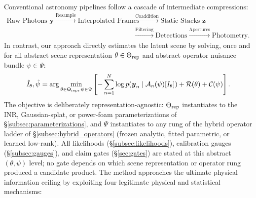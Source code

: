 \documentclass[11pt,a4paper]{article}
\begin{document}
Conventional astronomy pipelines follow a cascade of intermediate compressions:
\begin{equation*}
\begin{aligned}
\text{Raw Photons } \boldsymbol{y} \xrightarrow{\text{Resample}} \text{Interpolated Frames} &\xrightarrow{\text{Coaddition}} \text{Static Stacks } \boldsymbol{z} \\
&\xrightarrow{\text{Filtering}} \text{Detections} \xrightarrow{\text{Apertures}} \text{Photometry}.
\end{aligned}
\end{equation*}
In contrast, our approach directly estimates the latent scene by solving, once and for all abstract scene representation $\theta \in \Theta_{\rm rep}$ and abstract operator nuisance bundle $\psi \in \Psi$:
\begin{equation}
\hat{I}_\theta, \hat{\psi} = \arg\min_{\theta \in \Theta_{\rm rep},\, \psi \in \Psi} \left[ -\sum_{n=1}^N \log p(\boldsymbol{y}_n \mid \mathcal{A}_n(\psi)[I_\theta]) + \mathcal{R}(\theta) + \mathcal{C}(\psi) \right].
\label{eq:joint_objective}
\end{equation}
The objective is deliberately representation-agnostic: $\Theta_{\rm rep}$ instantiates to the INR, Gaussian-splat, or power-foam parameterizations of \S\ref{subsec:parameterizations}, and $\Psi$ instantiates to any rung of the hybrid operator ladder of \S\ref{subsec:hybrid_operators} (frozen analytic, fitted parametric, or learned low-rank). All likelihoods (\S\ref{subsec:likelihoods}), calibration gauges (\S\ref{subsec:gauges}), and claim gates (\S\ref{sec:gates}) are stated at this abstract $(\theta, \psi)$ level; no gate depends on which scene representation or operator rung produced a candidate product.
The method approaches the ultimate physical information ceiling by exploiting four legitimate physical and statistical mechanisms:
\end{document}
